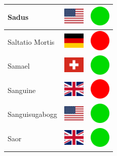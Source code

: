 \documentclass[12pt, a4paper, twoside]{report}
\begin{document}
\begin{center}
\begin{longtable}{|p{5cm}|p{2cm}|p{2cm}|}
 Sadus                                                      & \includegraphics[width=1cm]{../img/flags/us} &   \includegraphics[width=1cm]{../likes/y} \\ \hline
 Saltatio Mortis                                            & \includegraphics[width=1cm]{../img/flags/de} &   \includegraphics[width=1cm]{../likes/n} \\ \hline
 Samael                                                     & \includegraphics[width=1cm]{../img/flags/ch} &   \includegraphics[width=1cm]{../likes/y} \\ \hline
 Sanguine                                                   & \includegraphics[width=1cm]{../img/flags/gb} &   \includegraphics[width=1cm]{../likes/n} \\ \hline
 Sanguisugabogg                                             & \includegraphics[width=1cm]{../img/flags/us} &   \includegraphics[width=1cm]{../likes/y} \\ \hline
 Saor                                                       & \includegraphics[width=1cm]{../img/flags/gb} &   \includegraphics[width=1cm]{../likes/y} \\ \hline

\end{longtable}
\end{center}
\end{document}
